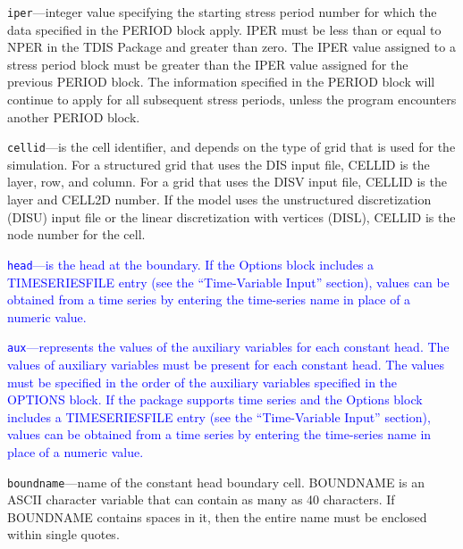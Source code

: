\begin{description}
\item \texttt{iper}---integer value specifying the starting stress period number for which the data specified in the PERIOD block apply.  IPER must be less than or equal to NPER in the TDIS Package and greater than zero.  The IPER value assigned to a stress period block must be greater than the IPER value assigned for the previous PERIOD block.  The information specified in the PERIOD block will continue to apply for all subsequent stress periods, unless the program encounters another PERIOD block.

\item \texttt{cellid}---is the cell identifier, and depends on the type of grid that is used for the simulation.  For a structured grid that uses the DIS input file, CELLID is the layer, row, and column.   For a grid that uses the DISV input file, CELLID is the layer and CELL2D number.  If the model uses the unstructured discretization (DISU) input file or the linear discretization with vertices (DISL), CELLID is the node number for the cell.

\item \textcolor{blue}{\texttt{head}---is the head at the boundary. If the Options block includes a TIMESERIESFILE entry (see the ``Time-Variable Input'' section), values can be obtained from a time series by entering the time-series name in place of a numeric value.}

\item \textcolor{blue}{\texttt{aux}---represents the values of the auxiliary variables for each constant head. The values of auxiliary variables must be present for each constant head. The values must be specified in the order of the auxiliary variables specified in the OPTIONS block.  If the package supports time series and the Options block includes a TIMESERIESFILE entry (see the ``Time-Variable Input'' section), values can be obtained from a time series by entering the time-series name in place of a numeric value.}

\item \texttt{boundname}---name of the constant head boundary cell.  BOUNDNAME is an ASCII character variable that can contain as many as 40 characters.  If BOUNDNAME contains spaces in it, then the entire name must be enclosed within single quotes.

\end{description}

